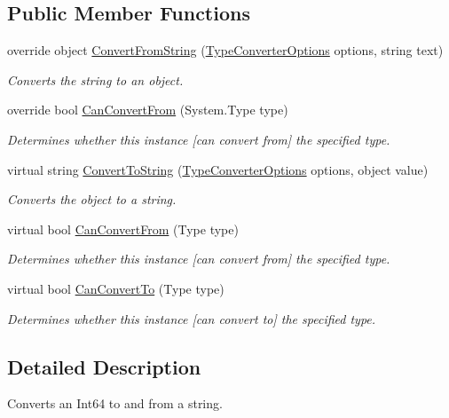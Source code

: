 \subsection*{Public Member Functions}
\begin{DoxyCompactItemize}
\item 
override object \hyperlink{a00122_a9080b7b6a5abc7d8271ffb6924c31b7c}{Convert\-From\-String} (\hyperlink{a00178}{Type\-Converter\-Options} options, string text)
\begin{DoxyCompactList}\small\item\em Converts the string to an object. \end{DoxyCompactList}\item 
override bool \hyperlink{a00122_a1aec0ff8b13f9f61240ecf2a337a6340}{Can\-Convert\-From} (System.\-Type type)
\begin{DoxyCompactList}\small\item\em Determines whether this instance \mbox{[}can convert from\mbox{]} the specified type. \end{DoxyCompactList}\item 
virtual string \hyperlink{a00088_a36cb2f9b24f15a671293f3a722324c27}{Convert\-To\-String} (\hyperlink{a00178}{Type\-Converter\-Options} options, object value)
\begin{DoxyCompactList}\small\item\em Converts the object to a string. \end{DoxyCompactList}\item 
virtual bool \hyperlink{a00088_a470d21adaa704eb281250dbd112ff91a}{Can\-Convert\-From} (Type type)
\begin{DoxyCompactList}\small\item\em Determines whether this instance \mbox{[}can convert from\mbox{]} the specified type. \end{DoxyCompactList}\item 
virtual bool \hyperlink{a00088_acb65bd8c8199d88d5b1629ae35d18514}{Can\-Convert\-To} (Type type)
\begin{DoxyCompactList}\small\item\em Determines whether this instance \mbox{[}can convert to\mbox{]} the specified type. \end{DoxyCompactList}\end{DoxyCompactItemize}


\subsection{Detailed Description}
Converts an Int64 to and from a string. 



